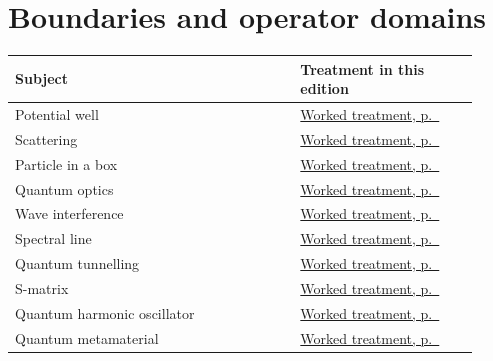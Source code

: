 \documentclass[11pt,oneside]{book}
\begin{document}
\section*{Boundaries and operator domains}
\begin{longtable}{p{0.57\linewidth}p{0.35\linewidth}}
\toprule Subject & Treatment in this edition \\
\midrule\endhead
{}\label{index:potential-well}Potential well & \hyperref[topic:potential-well]{Worked treatment, p.~\pageref*{topic:potential-well}} \\
\label{index:scattering}Scattering & \hyperref[topic:scattering]{Worked treatment, p.~\pageref*{topic:scattering}} \\
\label{index:particle-in-a-box}Particle in a box & \hyperref[topic:particle-in-a-box]{Worked treatment, p.~\pageref*{topic:particle-in-a-box}} \\
\label{index:quantum-optics}Quantum optics & \hyperref[topic:quantum-optics]{Worked treatment, p.~\pageref*{topic:quantum-optics}} \\
\label{index:wave-interference}Wave interference & \hyperref[topic:wave-interference]{Worked treatment, p.~\pageref*{topic:wave-interference}} \\
\label{index:spectral-line}Spectral line & \hyperref[topic:spectral-line]{Worked treatment, p.~\pageref*{topic:spectral-line}} \\
\label{index:quantum-tunnelling}Quantum tunnelling & \hyperref[topic:quantum-tunnelling]{Worked treatment, p.~\pageref*{topic:quantum-tunnelling}} \\
\label{index:s-matrix}S-matrix & \hyperref[topic:s-matrix]{Worked treatment, p.~\pageref*{topic:s-matrix}} \\
\label{index:quantum-harmonic-oscillator}Quantum harmonic oscillator & \hyperref[topic:quantum-harmonic-oscillator]{Worked treatment, p.~\pageref*{topic:quantum-harmonic-oscillator}} \\
\label{index:quantum-metamaterial}Quantum metamaterial & \hyperref[topic:quantum-metamaterial]{Worked treatment, p.~\pageref*{topic:quantum-metamaterial}} \\
\bottomrule
\end{longtable}
\end{document}
